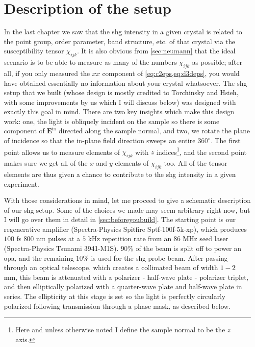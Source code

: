 \section{Description of the setup}\label{sec:setupdescription}

In the last chapter we saw that the \gls{shg} intensity in a given crystal is related to the point group, order parameter, band structure, etc. of that crystal via the susceptibility tensor $\chi_{ijk}$.
It is also obvious from \cref{sec:neumann} that the ideal scenario is to be able to measure as many of the numbers $\chi_{ijk}$ as possible; after all, if you only measured the $xx$ component of \cref{eq:c2eps,eq:d3deps}, you would have obtained essentially no information about your crystal whatsoever.
The \gls{shg} setup that we built (whose design is mostly credited to Torchinsky and Hsieh\citep{torchinsky_low_2014}, with some improvements by us which I will discuss below) was designed with exactly this goal in mind.
There are two key insights which make this design work: one, the light is obliquely incident on the sample so there is some component of $\bm{E}^\mathrm{in}$ directed along the sample normal, and two, we rotate the plane of incidence so that the in-plane field direction sweeps an entire $360^\circ$.
The first point allows us to measure elements of $\chi_{ijk}$ with $z$ indices\footnote{Here and unless otherwise noted I define the sample normal to be the $z$ axis.}, and the second point makes sure we get all of the $x$ and $y$ elements of $\chi_{ijk}$ too.
All of the tensor elements are thus given a chance to contribute to the \gls{shg} intensity in a given experiment.

With those considerations in mind, let me proceed to give a schematic description of our \gls{shg} setup.
Some of the choices we made may seem arbitrary right now, but I will go over them in detail in \cref{sec:beforeyoubuild}.
The starting point is our regenerative amplifier (Spectra-Physics Spitfire Sptf-100f-5k-xp), which produces $100$ \si{fs} $800$ \si{nm} pulses at a $5$ \si{kHz} repetition rate from an $86$ \si{MHz} seed laser (Spectra-Physics Tsunami 3941-M1S). 
$90\%$ of the beam is split off to power an \gls{opa}, and the remaining $10\%$ is used for the \gls{shg} probe beam.
After passing through an optical telescope, which creates a collimated beam of width $1-2$ \si{mm}, this beam is attenuated with a polarizer - half-wave plate - polarizer triplet, and then elliptically polarized with a quarter-wave plate and half-wave plate in series.
The ellipticity at this stage is set so the light is perfectly circularly polarized following transmission through a phase mask, as described below.

